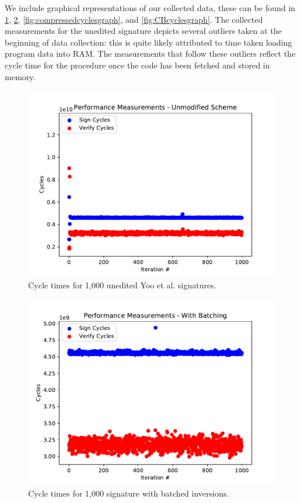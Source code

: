 We include graphical representations of our collected data, these can be found in \ref{fig:vanillacyclesgraph}, \ref{fig:batchedcyclesgraph}, \ref{fig:compressedcyclesgraph}, and \ref{fig:CBcyclesgraph}. The collected measurements for the unedited signature depicts several outliers taken at the beginning of data collection: this is quite likely attributed to time taken loading program data into RAM. The measurements that follow these outliers reflect the cycle time for the procedure once the code has been fetched and stored in memory. 

\begin{figure}
\includegraphics{vanilla-cycles.pdf}
\caption{Cycle times for 1,000 unedited Yoo et al. signatures.}
\label{fig:vanillacyclesgraph}
\end{figure}

\begin{figure}
\includegraphics{batched-cycles.pdf}
\caption{Cycle times for 1,000 signature with batched inversions.}
\label{fig:batchedcyclesgraph}
\end{figure}

